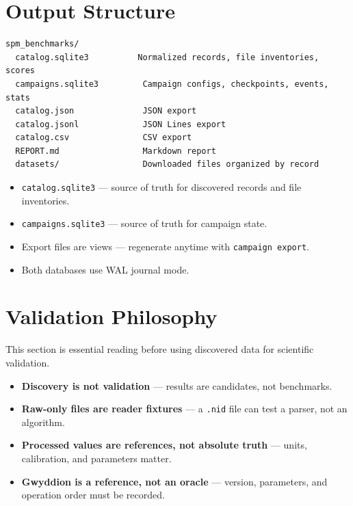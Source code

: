 \documentclass[11pt,a4paper]{article}
\begin{document}
\section{Output Structure}

\begin{lstlisting}
spm_benchmarks/
  catalog.sqlite3          Normalized records, file inventories, scores
  campaigns.sqlite3         Campaign configs, checkpoints, events, stats
  catalog.json              JSON export
  catalog.jsonl             JSON Lines export
  catalog.csv               CSV export
  REPORT.md                 Markdown report
  datasets/                 Downloaded files organized by record
\end{lstlisting}

\begin{itemize}[nosep]
  \item \texttt{catalog.sqlite3} --- source of truth for discovered records and file inventories.
  \item \texttt{campaigns.sqlite3} --- source of truth for campaign state.
  \item Export files are views --- regenerate anytime with \texttt{campaign export}.
  \item Both databases use WAL journal mode.
\end{itemize}

\section{Validation Philosophy}

This section is essential reading before using discovered data for scientific validation.

\begin{itemize}[nosep]
  \item \textbf{Discovery is not validation} --- results are candidates, not benchmarks.
  \item \textbf{Raw-only files are reader fixtures} --- a \texttt{.nid} file can test a parser, not an algorithm.
  \item \textbf{Processed values are references, not absolute truth} --- units, calibration, and parameters matter.
  \item \textbf{Gwyddion is a reference, not an oracle} --- version, parameters, and operation order must be recorded.
\end{itemize}
\end{document}
